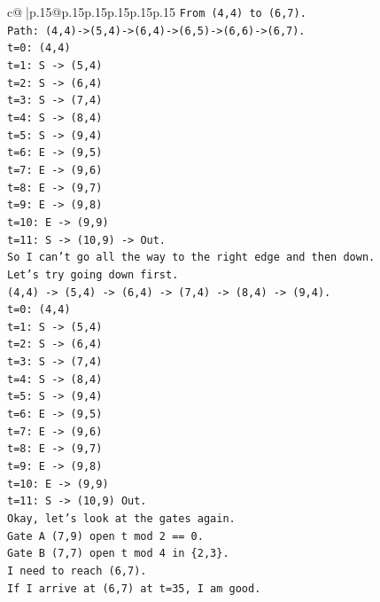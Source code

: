 \documentclass{article}
\begin{document}
{\begin{supertabular}{c@{$\;$}|p{.15\linewidth}@{}p{.15\linewidth}p{.15\linewidth}p{.15\linewidth}p{.15\linewidth}p{.15\linewidth}}
{{{\texttt{From (4,4) to (6,7).} \\
\texttt{Path: (4,4){-}>(5,4){-}>(6,4){-}>(6,5){-}>(6,6){-}>(6,7).} \\
\texttt{t=0: (4,4)} \\
\texttt{t=1: S {-}> (5,4)} \\
\texttt{t=2: S {-}> (6,4)} \\
\texttt{t=3: S {-}> (7,4)} \\
\texttt{t=4: S {-}> (8,4)} \\
\texttt{t=5: S {-}> (9,4)} \\
\texttt{t=6: E {-}> (9,5)} \\
\texttt{t=7: E {-}> (9,6)} \\
\texttt{t=8: E {-}> (9,7)} \\
\texttt{t=9: E {-}> (9,8)} \\
\texttt{t=10: E {-}> (9,9)} \\
\texttt{t=11: S {-}> (10,9) {-}> Out.} \\
\texttt{So I can't go all the way to the right edge and then down.} \\
\texttt{Let's try going down first.} \\
\texttt{(4,4) {-}> (5,4) {-}> (6,4) {-}> (7,4) {-}> (8,4) {-}> (9,4).} \\
\texttt{t=0: (4,4)} \\
\texttt{t=1: S {-}> (5,4)} \\
\texttt{t=2: S {-}> (6,4)} \\
\texttt{t=3: S {-}> (7,4)} \\
\texttt{t=4: S {-}> (8,4)} \\
\texttt{t=5: S {-}> (9,4)} \\
\texttt{t=6: E {-}> (9,5)} \\
\texttt{t=7: E {-}> (9,6)} \\
\texttt{t=8: E {-}> (9,7)} \\
\texttt{t=9: E {-}> (9,8)} \\
\texttt{t=10: E {-}> (9,9)} \\
\texttt{t=11: S {-}> (10,9) Out.} \\
\texttt{Okay, let's look at the gates again.} \\
\texttt{Gate A (7,9) open t mod 2 == 0.} \\
\texttt{Gate B (7,7) open t mod 4 in \{2,3\}.} \\
\texttt{I need to reach (6,7).} \\
\texttt{If I arrive at (6,7) at t=35, I am good.} \\
}}}
\end{supertabular}}
\end{document}
